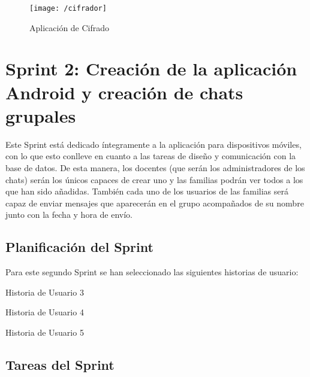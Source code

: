\begin{figure}[!h]
	\begin{center}
		\texttt{[image: /cifrador]}
		\caption{Aplicación de Cifrado}
		\label{fig:cifrador}
	\end{center}
\end{figure}

\clearpage

\section{Sprint 2: Creación de la aplicación Android y creación de chats grupales}
Este Sprint está dedicado íntegramente a la aplicación para dispositivos móviles, con lo que esto conlleve en cuanto a las tareas de diseño y comunicación con la base de datos. De esta manera, los docentes (que serán los administradores de los chats) serán los únicos capaces de crear uno y las familias podrán ver todos a los que han sido añadidas. También cada uno de los usuarios de las familias será capaz de enviar mensajes que aparecerán en el grupo acompañados de su nombre junto con la fecha y hora de envío.

\subsection{Planificación del Sprint}
Para este segundo Sprint se han seleccionado las siguientes historias de usuario:

\begin{table}[!htbp]
	\centering
	{\small
		
	}
	\caption[Historia de Usuario 3]
	{Historia de Usuario 3}
	\label{tab:historia3}
\end{table}

\begin{table}[!htbp]
	\centering
	{\small
		
	}
	\caption[Historia de Usuario 4]
	{Historia de Usuario 4}
	\label{tab:historia4}
\end{table}

\begin{table}[!htbp]
	\centering
	{\small
		
	}
	\caption[Historia de Usuario 5]
	{Historia de Usuario 5}
	\label{tab:historia5}
\end{table}

\newpage

\subsection{Tareas del Sprint}

